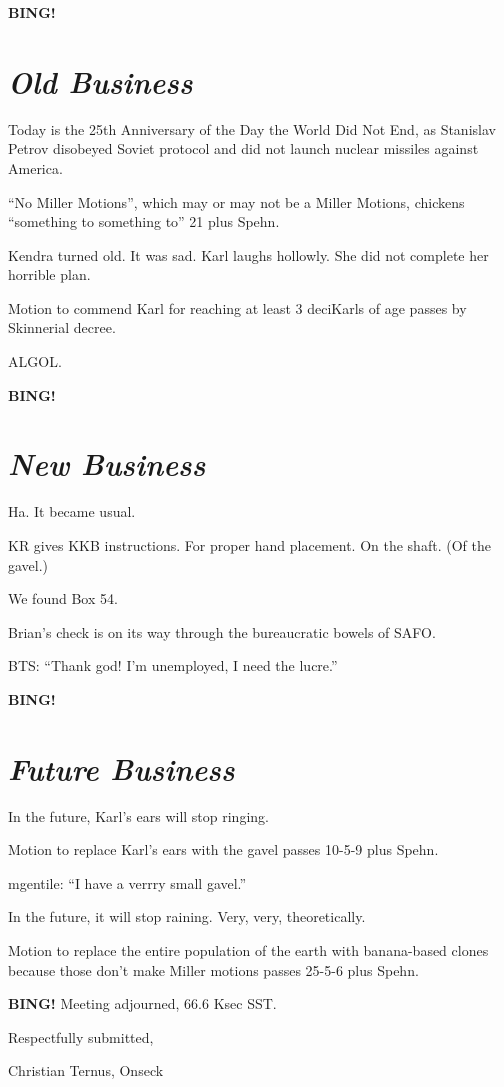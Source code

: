 \documentclass[10pt]{article}
\newcommand{\bing}{{\bf BING!} }
\newcommand{\goto}[1]{\bing \vskip 12pt \section*{{\em{#1}}}}
\newcommand{\ps}{ plus Spehn\xspace}
\begin{document}
\goto{Old Business}

Today is the 25th Anniversary of the Day the World Did Not End, as
Stanislav Petrov disobeyed Soviet protocol and did not launch nuclear
missiles against America.

``No Miller Motions'', which may or may not be a Miller Motions,
chickens ``something to something to'' 21 \ps.

Kendra turned old.  It was sad.  Karl laughs hollowly.  She did not
complete her horrible plan.

Motion to commend Karl for reaching at least 3 deciKarls of age passes
by Skinnerial decree.

ALGOL.

\goto{New Business}

Ha.  It became usual.

KR gives KKB instructions.  For proper hand placement.  On the shaft.
(Of the gavel.)

We found Box 54.

Brian's check is on its way through the bureaucratic bowels of SAFO.  

BTS: ``Thank god!  I'm unemployed, I need the lucre.''

\goto{Future Business}

In the future, Karl's ears will stop ringing.

Motion to replace Karl's ears with the gavel passes 10-5-9 \ps.

mgentile:  ``I have a verrry small gavel.''

In the future, it will stop raining.  Very, very, theoretically.

Motion to replace the entire population of the earth with banana-based
clones because those don't make Miller motions passes 25-5-6 \ps.

\bing
\noindent
Meeting adjourned, 66.6 Ksec SST.

\vspace{18pt}

\centerline{Respectfully submitted,}
\centerline{Christian Ternus, Onseck}
\end{document}
